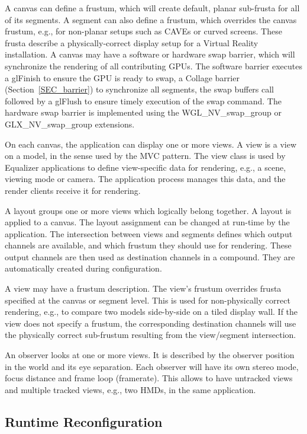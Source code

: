 \documentclass[10pt,journal,compsoc]{IEEEtran}
\newcommand{\sref}[1]{Section~\ref{#1}}
\begin{document}
A canvas can define a frustum, which will create default, planar sub-frusta for
all of its segments. A segment can also define a frustum, which overrides the
canvas frustum, e.g., for non-planar setups such as CAVEs or curved
screens. These frusta describe a physically-correct display setup for a Virtual
Reality installation. \label{sec:swap} A canvas may have a software or hardware
swap barrier, which will synchronize the rendering of all contributing GPUs. The
software barrier executes a \textsf{glFinish} to ensure the GPU is ready to
swap, a Collage barrier (\sref{SEC_barrier}) to synchronize all segments, the
swap buffers call followed by a \textsf{glFlush} to ensure timely execution of
the swap command. The hardware swap barrier is implemented using the
\textsf{WGL\_NV\_swap\_group} or \textsf{GLX\_NV\_swap\_group} extensions.

On each canvas, the application can display one or more views. A view is a view
on a model, in the sense used by the MVC pattern. The view class is used by
Equalizer applications to define view-specific data for rendering, e.g., a
scene, viewing mode or camera. The application process manages this data, and
the render clients receive it for rendering.

A layout groups one or more views which logically belong together. A layout is
applied to a canvas. The layout assignment can be changed at run-time by the
application. The intersection between views and segments defines which output
channels are available, and which frustum they should use for rendering. These
output channels are then used as destination channels in a compound. They are
automatically created during configuration.

A view may have a frustum description. The view's frustum overrides frusta
specified at the canvas or segment level. This is used for non-physically
correct rendering, e.g., to compare two models side-by-side on a tiled display
wall. If the view does not specify a frustum, the corresponding destination
channels will use the physically correct sub-frustum resulting from the
view/segment intersection.

\label{SEC_observer}
An observer looks at one or more views. It is described by the observer position
in the world and its eye separation. Each observer will have its own stereo
mode, focus distance and frame loop (framerate). This allows to have untracked
views and multiple tracked views, e.g., two HMDs, in the same application.

\subsection{Runtime Reconfiguration}\label{SEC_reconfig}
\end{document}
